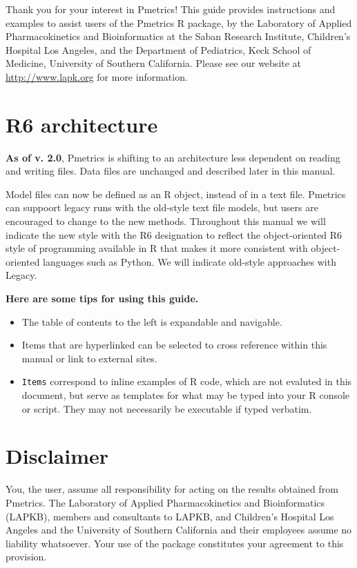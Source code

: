 \documentclass[
]{book}
\begin{document}
Thank you for your interest in Pmetrics! This guide provides
instructions and examples to assist users of the Pmetrics R package, by
the Laboratory of Applied Pharmacokinetics and Bioinformatics at the
Saban Research Institute, Children's Hospital Los Angeles, and the
Department of Pediatrics, Keck School of Medicine, University of
Southern California. Please see our website at
\href{http://www.lapk.org}{\uline{http://www.lapk.org}} for more
information.

\hypertarget{r6-architecture}{%
\section{R6 architecture}\label{r6-architecture}}

\textbf{As of v. 2.0}, Pmetrics is shifting to an architecture less dependent on
reading and writing files. Data files are unchanged and described later in
this manual.

Model files can now be defined as an R object, instead of in a text file.
Pmetrics can suppoort legacy runs with the old-style text file models, but
users are encouraged to change to the new methods. Throughout this manual we
will indicate the new style with the {R6} designation to reflect the
object-oriented R6 style of programming available in R that makes it more
consistent with object-oriented languages such as Python. We will indicate
old-style approaches with {Legacy}.

\textbf{Here are some tips for using this guide.}

\begin{itemize}
\item
  The table of contents to the left is expandable and navigable.
\item
  Items that are hyperlinked can be selected to cross reference
  within this manual or link to external sites.
\item
  \texttt{Items} correspond to inline examples of R code, which are not evaluted
  in this document, but serve as templates for what may be typed into your
  R console or script. They may not necessarily be executable if typed verbatim.
\end{itemize}

\hypertarget{disclaimer}{%
\section{Disclaimer}\label{disclaimer}}

You, the user, assume all responsibility for acting on the results
obtained from Pmetrics. The Laboratory of Applied Pharmacokinetics and
Bioinformatics (LAPKB), members and consultants to LAPKB, and Children's
Hospital Los Angeles and the University of Southern California and their
employees assume no liability whatsoever. Your use of the package
constitutes your agreement to this provision.
\end{document}
